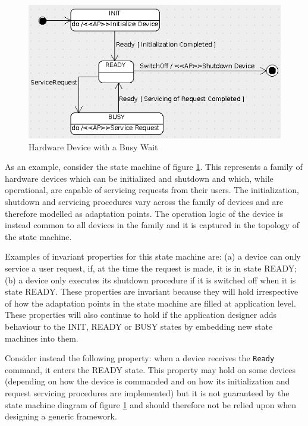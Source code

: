\documentclass[a4paper,10pt]{article}
\begin{document}
\begin{figure}[ht]
 \centering
 \includegraphics[scale=0.45,keepaspectratio=true]{../images/HwDeviceWithBusyWait.png}
 \caption{Hardware Device with a Busy Wait}
 \label{fig:HwDeviceWithBusyWait}
\end{figure}

As an example, consider the state machine of figure \ref{fig:HwDeviceWithBusyWait}. This represents a family of hardware devices which can be initialized and shutdown and which, while operational, are capable of servicing requests from their users. The initialization, shutdown and servicing procedures vary across the family of devices and are therefore modelled as adaptation points. The operation logic of the device is instead common to all devices in the family and it is captured in the topology of the state machine. 

Examples of invariant properties for this state machine are: (a) a device can only service a user request, if, at the time the request is made, it is in state READY; (b) a device only executes its shutdown procedure if it is switched off when it is state READY. These properties are invariant because they will hold irrespective of how the adaptation points in the state machine are filled at application level. These properties will also continue to hold if the application designer adds behaviour to the INIT, READY or BUSY states by embedding new state machines into them.

Consider instead the following property: when a device receives the \texttt{Ready} command, it enters the READY state. This property may hold on some devices (depending on how the device is commanded and on how its initialization and request servicing procedures are implemented) but it is not guaranteed by the state machine diagram of figure \ref{fig:HwDeviceWithBusyWait} and should therefore not be relied upon when designing a generic framework.
\end{document}
